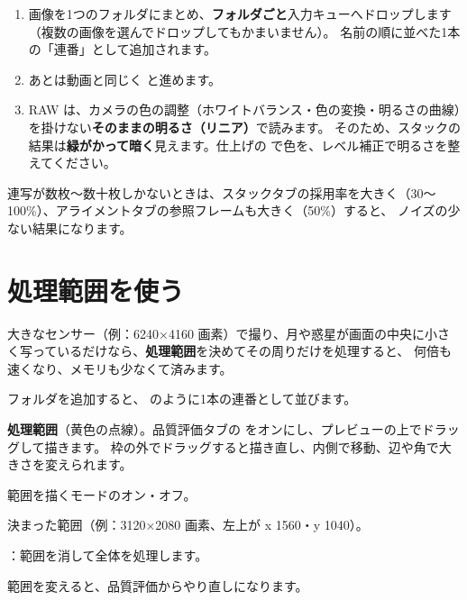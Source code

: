 \begin{enumerate}[itemsep=2pt]
  \item 画像を1つのフォルダにまとめ、\textbf{フォルダごと}入力キューへドロップします（複数の画像を選んでドロップしてもかまいません）。
        名前の順に並べた1本の「連番」として追加されます。
  \item あとは動画と同じく  と進めます。
  \item RAW は、カメラの色の調整（ホワイトバランス・色の変換・明るさの曲線）を掛けない\textbf{そのままの明るさ（リニア）}で読みます。
        そのため、スタックの結果は\textbf{緑がかって暗く}見えます。仕上げの  で色を、レベル補正で明るさを整えてください。
\end{enumerate}

\begin{tip}[写真の枚数が少ないとき]
  連写が数枚〜数十枚しかないときは、スタックタブの採用率を大きく（30〜100\%）、アライメントタブの参照フレームも大きく（50\%）すると、
  ノイズの少ない結果になります。
\end{tip}

\section{処理範囲を使う}\label{sec:roi-howto}

大きなセンサー（例：6240×4160 画素）で撮り、月や惑星が画面の中央に小さく写っているだけなら、\textbf{処理範囲}を決めてその周りだけを処理すると、
何倍も速くなり、メモリも少なくて済みます。


\begin{marklist}
  \item フォルダを追加すると、 のように1本の連番として並びます。
  \item \textbf{処理範囲}（黄色の点線）。品質評価タブの  をオンにし、プレビューの上でドラッグして描きます。
        枠の外でドラッグすると描き直し、内側で移動、辺や角で大きさを変えられます。
  \item 範囲を描くモードのオン・オフ。
  \item 決まった範囲（例：3120×2080 画素、左上が x 1560・y 1040）。
  \item {}：範囲を消して全体を処理します。
  \item 範囲を変えると、品質評価からやり直しになります。
\end{marklist}

